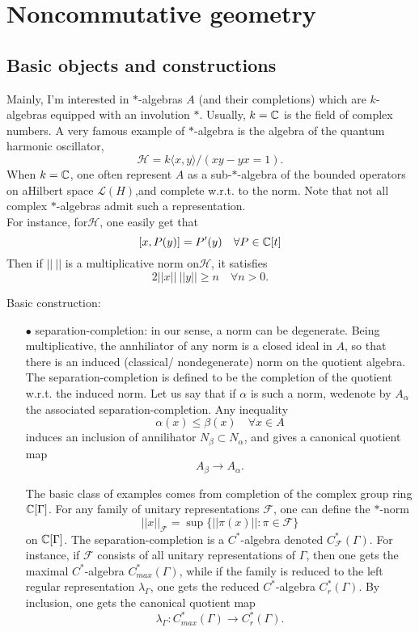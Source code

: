 \newpage
\section{Noncommutative geometry}

\subsection{Basic objects and constructions}

Mainly, I'm interested in $*$-algebras $A$ (and their completions) which are $k$-algebras equipped with an involution $*$. Usually, $k=\mathbb C$ is the field of complex numbers. A very famous example of $*$-algebra is the algebra of the quantum harmonic oscillator,
\[\mathcal H = k\langle x, y\rangle / (xy -yx = 1).\]
When $k=\mathbb C$, one often represent $A$ as a sub-$*$-algebra of the bounded operators on aHilbert space $\mathcal L(H)$,and complete w.r.t. to the norm. Note that not all complex $*$-algebras admit such a representation. \\

For instance, for$\mathcal H$, one easily get that 
\[[x,P(y)] = P'(y) \quad \forall P\in \mathbb C[t]\]
Then if $||\ ||$ is a multiplicative norm on$\mathcal H$, it satisfies
\[ 2 ||x|| \ ||y|| \geq n \quad \forall n>0.\]   

Basic construction:
\begin{itemize}
\item[$\bullet$] separation-completion: in our sense, a norm can be degenerate. Being multiplicative, the annhiliator of any norm is a closed ideal in $A$, so that there is an induced (classical/ nondegenerate) norm on the quotient algebra. The separation-completion is defined to be the completion of the quotient w.r.t. the induced norm. Let us say that if $\alpha$ is such a norm, wedenote by $A_\alpha$ the associated separation-completion. Any inequality 
\[\alpha(x) \leq \beta (x) \quad \forall x\in A\]
induces an inclusion of annilihator $N_\beta \subset N_\alpha$, and gives a canonical quotient map
\[A_\beta \rightarrow A_\alpha.\]

The basic class of examples comes from completion of the complex group ring $\mathbb C[\Gamma]$. For any family of unitary representations $\mathcal F$, one can define the $*$-norm
\[||x||_{\mathcal F} = \sup \{||\pi(x)|| : \pi\in \mathcal F\}\]
on $\mathbb C[\Gamma]$. The separation-completion is a $C^*$-algebra denoted $C^*_{\mathcal F}(\Gamma)$. For instance, if $\mathcal F$ consists of all unitary representations of $\Gamma$, then one gets the maximal $C^*$-algebra $C_{max}^*(\Gamma)$, while if the family is reduced to the left regular representation $\lambda_\Gamma$, one gets the reduced $C^*$-algebra $C^*_r(\Gamma)$. By inclusion, one gets the canonical quotient map
\[\lambda_\Gamma : C^*_{max}(\Gamma) \rightarrow C_r^*(\Gamma).\]  
 
\end{itemize}

